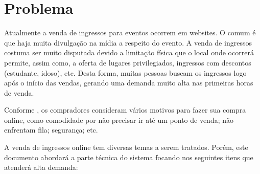 \chapter{Problema}

Atualmente a venda de ingressos para eventos ocorrem em websites.
O comum é que haja muita divulgação na mídia a respeito do evento.
A venda de ingressos costuma ser muito disputada devido a limitação
física que o local onde ocorrerá permite, assim como, a oferta de
lugares privilegiados, ingressos com descontos (estudante, idoso), etc.
Desta forma, muitas pessoas buscam os ingressos logo após o início das
vendas, gerando uma demanda muito alta nas primeiras horas de venda.

Conforme \cite{10-motivos-para-vender-online}, os compradores consideram
vários motivos para fazer sua compra online, como comodidade por não
precisar ir até um ponto de venda; não enfrentam fila; segurança; etc.

A venda de ingressos online
tem diversas temas a serem tratados. Porém, este documento abordará a parte
técnica do sistema focando nos seguintes itens que atenderá alta demanda:

